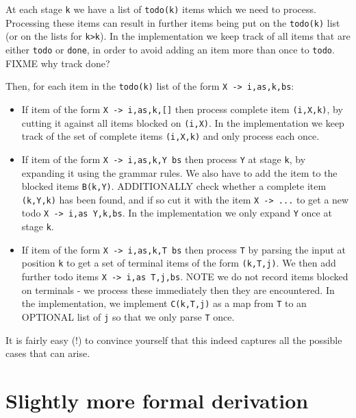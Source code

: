 \documentclass[]{article}
\begin{document}
\begin{multicols}{2}
At each stage \texttt{k} we have a list of \texttt{todo(k)} items which
we need to process. Processing these items can result in further items
being put on the \texttt{todo(k)} list (or on the lists for
\texttt{k\textquotesingle{}\textgreater{}k}). In the implementation we
keep track of all items that are either \texttt{todo} or \texttt{done},
in order to avoid adding an item more than once to \texttt{todo}. FIXME
why track done?

Then, for each item in the \texttt{todo(k)} list of the form
\texttt{X -\textgreater{} i,as,k,bs}:

\begin{itemize}
\item
  If item of the form \texttt{X -\textgreater{} i,as,k,{[}{]}} then
  process complete item \texttt{(i,X,k)}, by cutting it against all
  items blocked on \texttt{(i,X)}. In the implementation we keep track
  of the set of complete items \texttt{(i,X,k)} and only process each
  once.
\item
  If item of the form \texttt{X -\textgreater{} i,as,k,Y bs} then
  process \texttt{Y} at stage \texttt{k}, by expanding it using the
  grammar rules. We also have to add the item to the blocked items
  \texttt{B(k,Y)}. ADDITIONALLY check whether a complete item
  \texttt{(k,Y,k)} has been found, and if so cut it with the item
  \texttt{X -\textgreater{} ...} to get a new todo
  \texttt{X -\textgreater{} i,as Y,k,bs}. In the implementation we only
  expand \texttt{Y} once at stage \texttt{k}.
\item
  If item of the form \texttt{X -\textgreater{} i,as,k,T bs} then
  process \texttt{T} by parsing the input at position \texttt{k} to get
  a set of terminal items of the form \texttt{(k,T,j)}. We then add
  further todo items \texttt{X -\textgreater{} i,as T,j,bs}. NOTE we do
  not record items blocked on terminals - we process these immediately
  then they are encountered. In the implementation, we implement
  \texttt{C(k,T,j)} as a map from \texttt{T} to an OPTIONAL list of
  \texttt{j} so that we only parse \texttt{T} once.
\end{itemize}

It is fairly easy (!) to convince yourself that this indeed captures all
the possible cases that can arise.

\section{Slightly more formal derivation}


\end{multicols}
\end{document}
